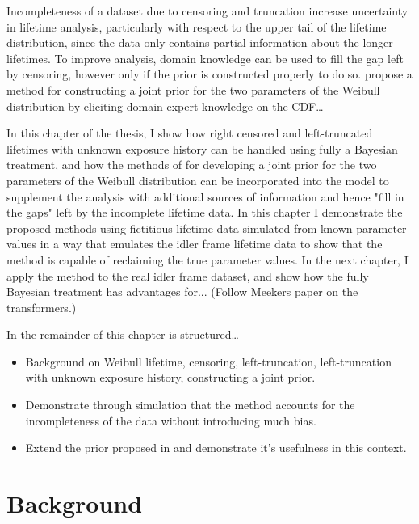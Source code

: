 Incompleteness of a dataset due to censoring and truncation increase uncertainty in lifetime analysis, particularly with respect to the upper tail of the lifetime distribution, since the data only contains partial information about the longer lifetimes. To improve analysis, domain knowledge can be used to fill the gap left by censoring, however only if the prior is constructed properly to do so. \citet{kaminskiy2005} propose a method for constructing a joint prior for the two parameters of the Weibull distribution by eliciting domain expert knowledge on the CDF\ldots

In this chapter of the thesis, I show how right censored and left-truncated lifetimes with unknown exposure history can be handled using fully a Bayesian treatment, and how the methods of \citet{kaminskiy2005} for developing a joint prior for the two parameters of the Weibull distribution can be incorporated into the model to supplement the analysis with additional sources of information and hence "fill in the gaps" left by the incomplete lifetime data. In this chapter I demonstrate the proposed methods using fictitious lifetime data simulated from known parameter values in a way that emulates the idler frame lifetime data to show that the method is capable of reclaiming the true parameter values. In the next chapter, I apply the method to the real idler frame dataset, and show how the fully Bayesian treatment has advantages for... (Follow Meekers paper on the transformers.)

In the remainder of this chapter is structured\ldots
\begin{itemize}
    \item Background on Weibull lifetime, censoring, left-truncation, left-truncation with unknown exposure history, constructing a joint prior.
    \item Demonstrate through simulation that the method accounts for the incompleteness of the data without introducing much bias.
    \item Extend the prior proposed in \citet{kaminskiy2005} and demonstrate it's usefulness in this context.
\end{itemize}


\section{Background}

